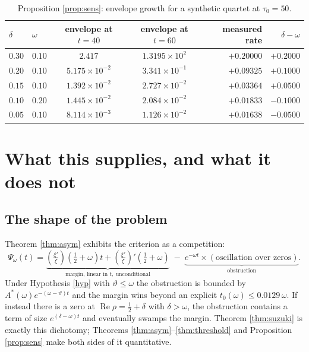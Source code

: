 \documentclass[11pt,reqno]{amsart}
\theoremstyle{plain}
\theoremstyle{definition}
\newcommand{\Rp}{\operatorname{Re}}
\newcommand{\lxi}[1]{\left(\tfrac{\xi'}{\xi}\right)\!#1}
\begin{document}
\begin{table}[htbp]
\centering
\begin{tabular}{@{}llccrr@{}}
\toprule
$\delta$ & $\omega$ & envelope at $t=40$ & envelope at $t=60$ & measured rate & $\delta-\omega$\\
\midrule
$0.30$ & $0.10$ & $2.417$               & $1.3195\times10^{2}$ & $+0.20000$ & $+0.2000$\\
$0.20$ & $0.10$ & $5.175\times10^{-2}$  & $3.341\times10^{-1}$ & $+0.09325$ & $+0.1000$\\
$0.15$ & $0.10$ & $1.392\times10^{-2}$  & $2.727\times10^{-2}$ & $+0.03364$ & $+0.0500$\\
$0.10$ & $0.20$ & $1.445\times10^{-2}$  & $2.084\times10^{-2}$ & $+0.01833$ & $-0.1000$\\
$0.05$ & $0.10$ & $8.114\times10^{-3}$  & $1.126\times10^{-2}$ & $+0.01638$ & $-0.0500$\\
\bottomrule
\end{tabular}
\vspace{2mm}
\caption{Proposition \ref{prop:sens}: envelope growth for a synthetic quartet at $\tau_0=50$.}
\label{tab:sens}
\end{table}

\section{What this supplies, and what it does not}\label{sec:discussion}

\subsection{The shape of the problem}
Theorem \ref{thm:asym} exhibits the criterion as a competition:
\begin{equation}\label{eq:competition}
  \Psi_\omega(t)=\underbrace{\lxi{\left(\tfrac12+\omega\right)}t+\lxi{'\left(\tfrac12+\omega\right)}}
                 _{\text{margin, linear in }t,\ \text{unconditional}}
  \;-\;\underbrace{e^{-\omega t}\times(\text{oscillation over zeros})}_{\text{obstruction}} .
\end{equation}
Under Hypothesis \ref{hyp} with $\vartheta\le\omega$ the obstruction is bounded by
$A^{*}(\omega)e^{-(\omega-\vartheta)t}$ and the margin wins beyond an explicit
$t_0(\omega)\le0.0129\,\omega$. If instead there is a zero at $\Rp\rho=\tfrac12+\delta$ with
$\delta>\omega$, the obstruction contains a term of size $e^{(\delta-\omega)t}$ and eventually
swamps the margin. Theorem \ref{thm:suzuki} is exactly this dichotomy; Theorems
\ref{thm:asym}--\ref{thm:threshold} and Proposition \ref{prop:sens} make both sides of it
quantitative.
\end{document}
